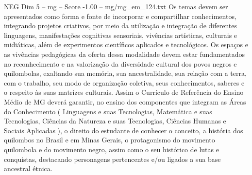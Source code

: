 \begin{textsample}{NEG Dim 5 – mg – Score -1.00 – mg/mg\_em\_124.txt}
Os temas devem ser apresentados como forma e fonte de incorporar e compartilhar conhecimentos, integrando projetos criativos, por meio da utilização e integração de diferentes linguagens, manifestações cognitivas sensoriais, vivências artísticas, culturais e midiáticas, além de experimentos científicos aplicados e tecnológicos.
Os espaços e as vivências pedagógicas da oferta dessa modalidade devem estar fundamentados no reconhecimento e na valorização da diversidade cultural dos povos negros e quilombolas, exaltando sua memória, sua ancestralidade, sua relação com a terra, com o trabalho, seu modo de organização coletiva, seus conhecimentos, saberes e o respeito às suas matrizes culturais.
Assim o Currículo de Referência do Ensino Médio de MG deverá garantir, no ensino dos componentes que integram as Áreas do Conhecimento ( Linguagens e suas Tecnologias, Matemática e suas Tecnologias, Ciências da Natureza e suas Tecnologias, Ciências Humanas e Sociais Aplicadas ), o direito do estudante de conhecer o conceito, a história dos quilombos no Brasil e em Minas Gerais, o protagonismo do movimento quilombola e do movimento negro, assim como o seu histórico de lutas e conquistas, destacando personagens pertencentes e/ou ligados a sua base ancestral étnica.

\end{textsample}
